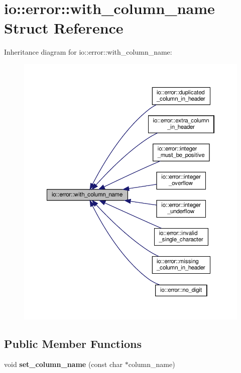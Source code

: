 \hypertarget{structio_1_1error_1_1with__column__name}{}\section{io\+:\+:error\+:\+:with\+\_\+column\+\_\+name Struct Reference}
\label{structio_1_1error_1_1with__column__name}


Inheritance diagram for io\+:\+:error\+:\+:with\+\_\+column\+\_\+name\+:\nopagebreak
\begin{figure}[H]
\begin{center}
\leavevmode
\includegraphics[width=350pt]{structio_1_1error_1_1with__column__name__inherit__graph}
\end{center}
\end{figure}
\subsection*{Public Member Functions}
\begin{DoxyCompactItemize}
\item 
\mbox{\label{structio_1_1error_1_1with__column__name_a2a8144d3591a4bb618368ca7261befef}} 
void {\bfseries set\+\_\+column\+\_\+name} (const char $\ast$column\+\_\+name)
\end{DoxyCompactItemize}
